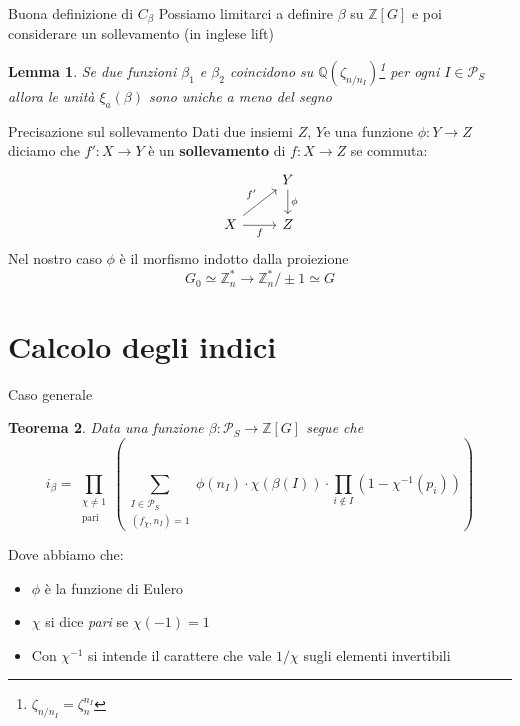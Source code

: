 \documentclass{beamer}
\theoremstyle{plain}
\newtheorem{teo}{Teorema}[section]
\newtheorem{lem}[teo]{Lemma}
\theoremstyle{remark}
\theoremstyle{definition}
\newcommand{\PS}{\mathcal{P}_S}
\newcommand{\Z}{\mathbb{Z}}
\newcommand{\Q}{\mathbb{Q}}
\begin{document}
	\begin{frame}{Buona definizione di $C_ \beta $}
		Possiamo limitarci a definire $\beta$ su $ \Z[G] $ e poi considerare un sollevamento (in inglese lift)\\
		\pause
		\begin{lem}
			Se due funzioni $ \beta_1 $ e $ \beta_2 $ coincidono su $ \Q(\zeta_{n/n_I} )$\footnote{$ \zeta_{n/n_I} = \zeta_n^{n_I} $} per ogni $ I \in \PS $ allora le unità $ \xi_a (\beta) $ sono uniche a meno del segno
		\end{lem}
	\end{frame}
	
	\begin{frame}[fragile]{Precisazione sul sollevamento}
		Dati due insiemi $ Z, \, Y $e una funzione $ \phi : Y \to Z $ diciamo che $ f' : X \to Y $ è un \textbf{sollevamento} di $ f : X \to Z $ se commuta: 
			\[\begin{tikzcd}
			 & {Y} \arrow[d, " \phi"] \\
			{X} \arrow[r, "f"'] \arrow[ru, "f'"] & {Z}               
			\end{tikzcd}\]
			\pause
			Nel nostro caso $\phi$ è il morfismo indotto dalla proiezione 
			$$G_0 \simeq  \Z_n^\ast  \to  \Z_n^\ast / \pm 1  \simeq G$$
	\end{frame}
	
	\section{Calcolo degli indici}
	
	\begin{frame}{Caso generale}
		\begin{teo}
				Data una funzione $ \beta : \PS \to \Z [G] $ segue che
					\begin{equation}
					\label{eq:idx1}
						i_\beta = \prod_{ \substack{\chi \neq 1 \\ \text{pari}}} \left( \sum_{\substack{ I \in \PS \\ (f_\chi , n_I) = 1}} \phi (n_I) \cdot \chi (\beta (I)) \cdot \prod_{i \not \in  I} (1- \chi^{-1} (p_i)) \right) 
					\end{equation}
		\end{teo}\pause
		Dove abbiamo che:
		\begin{itemize}
			\item $\phi$ è la funzione di Eulero 
			\item $\chi$ si dice \textit{pari} se $ \chi (-1) = 1 $
			\item Con $ \chi^{-1} $ si intende il carattere che vale $ 1/\chi $ sugli elementi invertibili
		\end{itemize}
	\end{frame}	
	
\end{document}
